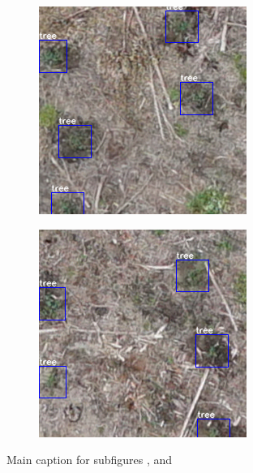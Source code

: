\documentclass[a4paper, 12pt]{report}
\begin{document}
\begin{enumerate}[label= \textit{\alph*)}]
\begin{figure}[!h]
\begin{subfigure}[!h]{0.45\textwidth}
    \includegraphics[width=\linewidth]{Images/split2}
        \label{fig:subfig2}
    \end{subfigure}
 
    \begin{subfigure}[!h]{0.45\textwidth}
    	\includegraphics[width=\linewidth]{Images/split3}
        \label{fig:subfig3}
    \end{subfigure}
    \caption[Optional caption for list of figures]{Main caption for subfigures ,  and }
\end{figure}
\end{enumerate}
\end{document}
